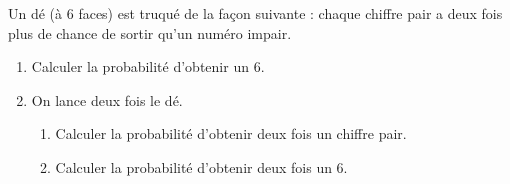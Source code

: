 
\begin{exo}
Un d\'e (\`a 6 faces) est truqu\'e de la façon suivante : chaque chiffre pair a deux fois plus de chance de sortir qu'un
num\'ero impair.
\begin{enumerate}
	\item Calculer la probabilit\'e d'obtenir un 6.
	\item On lance deux fois le d\'e.
\begin{enumerate}
	\item Calculer la probabilit\'e d'obtenir deux fois un chiffre pair.
	\item Calculer la probabilit\'e d'obtenir deux fois un 6.
\end{enumerate}
\end{enumerate}
\end{exo}




